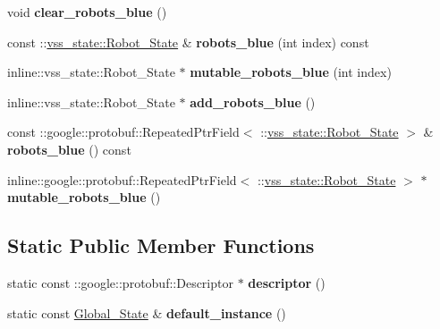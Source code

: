 \begin{DoxyCompactItemize}
\item 
void {\bfseries clear\+\_\+robots\+\_\+blue} ()\hypertarget{classvss__state_1_1Global__State_ae88bcfb62ea5ea68673a48aaec873723}{}\label{classvss__state_1_1Global__State_ae88bcfb62ea5ea68673a48aaec873723}

\item 
const \+::\hyperlink{classvss__state_1_1Robot__State}{vss\+\_\+state\+::\+Robot\+\_\+\+State} \& {\bfseries robots\+\_\+blue} (int index) const \hypertarget{classvss__state_1_1Global__State_a92551a5a96b8585f89cc37c55b0c4e46}{}\label{classvss__state_1_1Global__State_a92551a5a96b8585f89cc37c55b0c4e46}

\item 
inline\+::vss\+\_\+state\+::\+Robot\+\_\+\+State $\ast$ {\bfseries mutable\+\_\+robots\+\_\+blue} (int index)\hypertarget{classvss__state_1_1Global__State_a1caf337906ddf4fa47b606dc76cd8a3b}{}\label{classvss__state_1_1Global__State_a1caf337906ddf4fa47b606dc76cd8a3b}

\item 
inline\+::vss\+\_\+state\+::\+Robot\+\_\+\+State $\ast$ {\bfseries add\+\_\+robots\+\_\+blue} ()\hypertarget{classvss__state_1_1Global__State_a3150ca6510afc0a88b10491642dff24a}{}\label{classvss__state_1_1Global__State_a3150ca6510afc0a88b10491642dff24a}

\item 
const \+::google\+::protobuf\+::\+Repeated\+Ptr\+Field$<$ \+::\hyperlink{classvss__state_1_1Robot__State}{vss\+\_\+state\+::\+Robot\+\_\+\+State} $>$ \& {\bfseries robots\+\_\+blue} () const \hypertarget{classvss__state_1_1Global__State_ad659e30adf37a0e412765337eb28f233}{}\label{classvss__state_1_1Global__State_ad659e30adf37a0e412765337eb28f233}

\item 
inline\+::google\+::protobuf\+::\+Repeated\+Ptr\+Field$<$ \+::\hyperlink{classvss__state_1_1Robot__State}{vss\+\_\+state\+::\+Robot\+\_\+\+State} $>$ $\ast$ {\bfseries mutable\+\_\+robots\+\_\+blue} ()\hypertarget{classvss__state_1_1Global__State_a73be200ff11edfc042221b579672d3b4}{}\label{classvss__state_1_1Global__State_a73be200ff11edfc042221b579672d3b4}

\end{DoxyCompactItemize}
\subsection*{Static Public Member Functions}
\begin{DoxyCompactItemize}
\item 
static const \+::google\+::protobuf\+::\+Descriptor $\ast$ {\bfseries descriptor} ()\hypertarget{classvss__state_1_1Global__State_af5963eb38d472f2508e180fdf42c4a22}{}\label{classvss__state_1_1Global__State_af5963eb38d472f2508e180fdf42c4a22}

\item 
static const \hyperlink{classvss__state_1_1Global__State}{Global\+\_\+\+State} \& {\bfseries default\+\_\+instance} ()\hypertarget{classvss__state_1_1Global__State_a1bf08b600180f360bcd37c58f3e50b16}{}\label{classvss__state_1_1Global__State_a1bf08b600180f360bcd37c58f3e50b16}

\end{DoxyCompactItemize}
